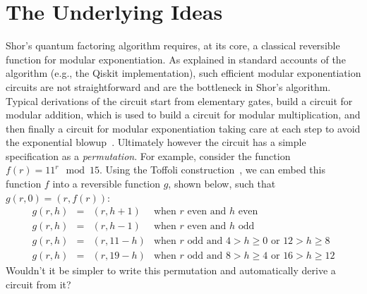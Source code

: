 \section{The Underlying Ideas}



Shor's quantum factoring algorithm requires, at its core, a classical reversible function for modular exponentiation. As
explained in standard accounts of the algorithm (e.g., the Qiskit implementation), such efficient modular exponentiation
circuits are not straightforward and are the bottleneck in Shor’s algorithm. Typical derivations of the circuit start
from elementary gates, build a circuit for modular addition, which is used to build a circuit for modular
multiplication, and then finally a circuit for modular exponentiation taking care at each step to avoid the exponential
blowup~\cite{shorefficient}. Ultimately however the circuit has a simple specification as a \emph{permutation}. For
example, consider the function $f(r) = 11^{r} \mod 15$. Using the Toffoli construction~\cite{Toffoli:1980}, we can embed
this function $f$ into a reversible function $g$, shown below, such that $g(r,0) = (r,f(r))$:
\[\begin{array}{rcll}
g(r,h) &=& (r,h+1) & \mbox{when~$r$~even~and~$h$~even} \\
g(r,h) &=& (r,h-1) & \mbox{when~$r$~even~and~$h$~odd} \\
g(r,h) &=& (r,11-h) & \mbox{when~$r$~odd~and~$4 > h \geq 0$~or~$12 > h \geq 8$} \\
g(r,h) &=& (r,19-h) & \mbox{when~$r$~odd~and~$8 > h \geq 4$~or~$16 > h \geq 12$}
\end{array}\]
Wouldn't it be simpler to write this permutation and automatically derive a circuit from it?







